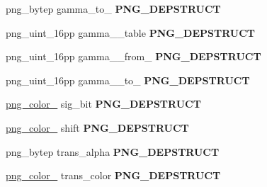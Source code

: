 \begin{DoxyCompactItemize}
\item 
png\+\_\+bytep gamma\+\_\+to\+\_ {\bfseries P\+N\+G\+\_\+\+D\+E\+P\+S\+T\+R\+U\+CT}\hypertarget{structpng__struct__def_a37549ec314ed913d844700a917e7f8f9}{}\label{structpng__struct__def_a37549ec314ed913d844700a917e7f8f9}

\item 
png\+\_\+uint\+\_\+16pp gamma\+\_\+\_\+table {\bfseries P\+N\+G\+\_\+\+D\+E\+P\+S\+T\+R\+U\+CT}\hypertarget{structpng__struct__def_a88123d9e976e0ee9362bc8aa3e59292b}{}\label{structpng__struct__def_a88123d9e976e0ee9362bc8aa3e59292b}

\item 
png\+\_\+uint\+\_\+16pp gamma\+\_\+\_\+from\+\_ {\bfseries P\+N\+G\+\_\+\+D\+E\+P\+S\+T\+R\+U\+CT}\hypertarget{structpng__struct__def_adf511bd4bd668cfe67734f166d3ef758}{}\label{structpng__struct__def_adf511bd4bd668cfe67734f166d3ef758}

\item 
png\+\_\+uint\+\_\+16pp gamma\+\_\+\_\+to\+\_ {\bfseries P\+N\+G\+\_\+\+D\+E\+P\+S\+T\+R\+U\+CT}\hypertarget{structpng__struct__def_ade544b33a1f73a5bb1db2d5ea6399cde}{}\label{structpng__struct__def_ade544b33a1f73a5bb1db2d5ea6399cde}

\item 
\hyperlink{structpng__color__8__struct}{png\+\_\+color\+\_} sig\+\_\+bit {\bfseries P\+N\+G\+\_\+\+D\+E\+P\+S\+T\+R\+U\+CT}\hypertarget{structpng__struct__def_a39d4ae4df4a5ead0799aea2e6b7de5e2}{}\label{structpng__struct__def_a39d4ae4df4a5ead0799aea2e6b7de5e2}

\item 
\hyperlink{structpng__color__8__struct}{png\+\_\+color\+\_} shift {\bfseries P\+N\+G\+\_\+\+D\+E\+P\+S\+T\+R\+U\+CT}\hypertarget{structpng__struct__def_af303ae02b8bf39d4101c483afdb5c700}{}\label{structpng__struct__def_af303ae02b8bf39d4101c483afdb5c700}

\item 
png\+\_\+bytep trans\+\_\+alpha {\bfseries P\+N\+G\+\_\+\+D\+E\+P\+S\+T\+R\+U\+CT}\hypertarget{structpng__struct__def_af2c2e69c0dc7dab9b06f289e400336d7}{}\label{structpng__struct__def_af2c2e69c0dc7dab9b06f289e400336d7}

\item 
\hyperlink{structpng__color__16__struct}{png\+\_\+color\+\_} trans\+\_\+color {\bfseries P\+N\+G\+\_\+\+D\+E\+P\+S\+T\+R\+U\+CT}\hypertarget{structpng__struct__def_a1b97a8631ad902f2ed8719153b755244}{}\label{structpng__struct__def_a1b97a8631ad902f2ed8719153b755244}


\end{DoxyCompactItemize}
